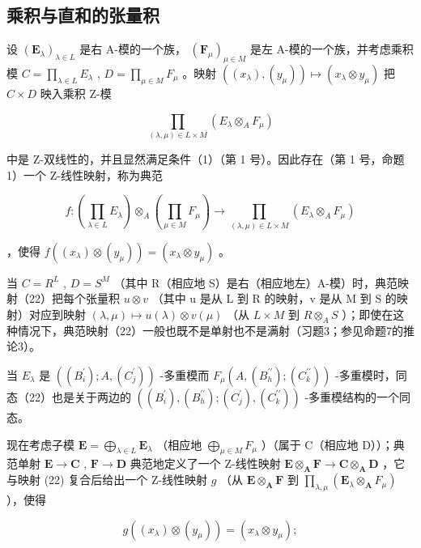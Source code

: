 \subsection{乘积与直和的张量积}

设 \((\mathbf{E}_{\lambda})_{\lambda \in L}\) 是右 A-模的一个族， \((\mathbf{F}_{\mu})_{\mu \in M}\) 是左 A-模的一个族，并考虑乘积模 \(C = \prod_{\lambda \in L} E_{\lambda}\) , \(D = \prod_{\mu \in M} F_{\mu}\) 。映射 \(((x_{\lambda}), (y_{\mu})) \mapsto (x_{\lambda} \otimes y_{\mu})\) 把 \(C \times D\) 映入乘积 Z-模

\[
\prod_ {(\lambda , \mu) \in L \times M} (E _ {\lambda} \otimes_ {A} F _ {\mu})
\]

中是 Z-双线性的，并且显然满足条件（1）（第 1 号）。因此存在（第 1 号，命题 1）一个 Z-线性映射，称为典范

\[
f: \left(\prod_ {\lambda \in L} E _ {\lambda}\right) \otimes_ {A} \left(\prod_ {\mu \in M} F _ {\mu}\right)\rightarrow \prod_ {(\lambda , \mu) \in L \times M} (E _ {\lambda} \otimes_ {A} F _ {\mu})\tag{22}
\]

，使得 \(f((x_{\lambda}) \otimes (y_{\mu})) = (x_{\lambda} \otimes y_{\mu})\) 。

当 \(C = R^{L}\) , \(D = S^{M}\) （其中 R（相应地 S）是右（相应地左）A-模）时，典范映射（22）把每个张量积 \(u \otimes v\) （其中 u 是从 L 到 R 的映射，v 是从 M 到 S 的映射）对应到映射 \((\lambda, \mu) \mapsto u(\lambda) \otimes v(\mu)\) （从 \(L \times M\) 到 \(R \otimes_{A} S\) ）；即使在这种情况下，典范映射（22）一般也既不是单射也不是满射（习题3；参见命题7的推论3）。

当 \(E_{\lambda}\) 是 \(((B_{i}^{\prime}); A, (C_{j}^{\prime}))\) -多重模而 \(F_{\mu}(A, (B_{h}^{\prime\prime}); (C_{k}^{\prime\prime}))\) -多重模时，同态（22）也是关于两边的 \(((B_{i}^{\prime}), (B_{h}^{\prime\prime}); (C_{j}^{\prime}), (C_{k}^{\prime\prime}))\) -多重模结构的一个同态。

现在考虑子模 \(\mathbf{E} = \bigoplus_{\lambda \in L} \mathbf{E}_{\lambda}\) （相应地 \(\bigoplus_{\mu \in M} F_{\mu}\) ）（属于 C（相应地 D））；典范单射 \(\mathbf{E} \to \mathbf{C}\) , \(\mathbf{F} \to \mathbf{D}\) 典范地定义了一个 Z-线性映射 \(\mathbf{E} \otimes_{\mathbf{A}} \mathbf{F} \to \mathbf{C} \otimes_{\mathbf{A}} \mathbf{D}\) ，它与映射 (22) 复合后给出一个 Z-线性映射 \(g\) （从 \(\mathbf{E} \otimes_{\mathbf{A}} \mathbf{F}\) 到 \(\prod_{\lambda, \mu} (\mathbf{E}_{\lambda} \otimes_{\mathbf{A}} F_{\mu})\) ），使得

\[
g ((x _ {\lambda}) \otimes (y _ {\mu})) = (x _ {\lambda} \otimes y _ {\mu});
\]

